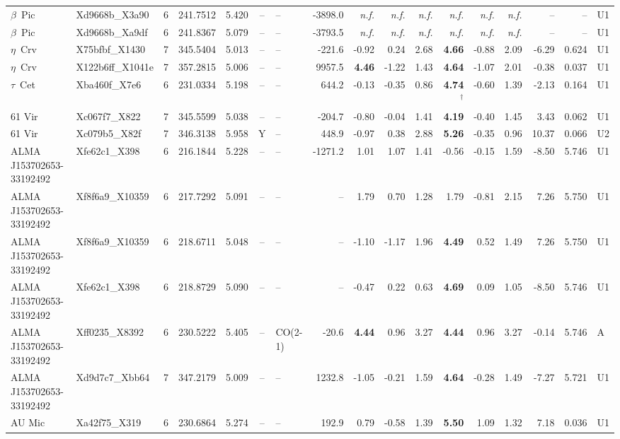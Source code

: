 \begin{tabular}{@{}l@{~}l@{~}c@{~}r@{~}r@{~}c@{~}l@{~}r@{~~}r@{~}r@{~}r@{~~}r@{~}r@{~}r@{~~}r@{~}r@{~}l@{}}
$\beta$~Pic & Xd9668b\_X3a90 & 6 & 241.7512 & 5.420 & -- & -- & -3898.0 & \emph{n.f.} & \emph{n.f.} & \emph{n.f.} & \emph{n.f.} & \emph{n.f.} & \emph{n.f.} & -- & -- & U1 \\
$\beta$~Pic & Xd9668b\_Xa9df & 6 & 241.8367 & 5.079 & -- & -- & -3793.5 & \emph{n.f.} & \emph{n.f.} & \emph{n.f.} & \emph{n.f.} & \emph{n.f.} & \emph{n.f.} & -- & -- & U1 \\
$\eta$~Crv & X75bfbf\_X1430 & 7 & 345.5404 & 5.013 & -- & -- & -221.6 & -0.92 & 0.24 & 2.68 & \textbf{4.66} & -0.88 & 2.09 & -6.29 & 0.624 & U1 \\
$\eta$~Crv & X122b6ff\_X1041e & 7 & 357.2815 & 5.006 & -- & -- & 9957.5 & \textbf{4.46} & -1.22 & 1.43 & \textbf{4.64} & -1.07 & 2.01 & -0.38 & 0.037 & U1 \\
$\tau$~Cet & Xba460f\_X7e6 & 6 & 231.0334 & 5.198 & -- & -- & 644.2 & -0.13 & -0.35 & 0.86 & \textbf{4.74}$^{\dagger}$ & -0.60 & 1.39 & -2.13 & 0.164 & U1 \\
61 Vir & Xc067f7\_X822 & 7 & 345.5599 & 5.038 & -- & -- & -204.7 & -0.80 & -0.04 & 1.41 & \textbf{4.19} & -0.40 & 1.45 & 3.43 & 0.062 & U1 \\
61 Vir & Xc079b5\_X82f & 7 & 346.3138 & 5.958 & Y & -- & 448.9 & -0.97 & 0.38 & 2.88 & \textbf{5.26} & -0.35 & 0.96 & 10.37 & 0.066 & U2 \\
ALMA J153702653-33192492 & Xfe62c1\_X398 & 6 & 216.1844 & 5.228 & -- & -- & -1271.2 & 1.01 & 1.07 & 1.41 & -0.56 & -0.15 & 1.59 & -8.50 & 5.746 & U1 \\
ALMA J153702653-33192492 & Xf8f6a9\_X10359 & 6 & 217.7292 & 5.091 & -- & -- & -- & 1.79 & 0.70 & 1.28 & 1.79 & -0.81 & 2.15 & 7.26 & 5.750 & U1 \\
ALMA J153702653-33192492 & Xf8f6a9\_X10359 & 6 & 218.6711 & 5.048 & -- & -- & -- & -1.10 & -1.17 & 1.96 & \textbf{4.49} & 0.52 & 1.49 & 7.26 & 5.750 & U1 \\
ALMA J153702653-33192492 & Xfe62c1\_X398 & 6 & 218.8729 & 5.090 & -- & -- & -- & -0.47 & 0.22 & 0.63 & \textbf{4.69} & 0.09 & 1.05 & -8.50 & 5.746 & U1 \\
ALMA J153702653-33192492 & Xff0235\_X8392 & 6 & 230.5222 & 5.405 & -- & CO(2-1) & -20.6 & \textbf{4.44} & 0.96 & 3.27 & \textbf{4.44} & 0.96 & 3.27 & -0.14 & 5.746 & A \\
ALMA J153702653-33192492 & Xd9d7c7\_Xbb64 & 7 & 347.2179 & 5.009 & -- & -- & 1232.8 & -1.05 & -0.21 & 1.59 & \textbf{4.64} & -0.28 & 1.49 & -7.27 & 5.721 & U1 \\
AU Mic & Xa42f75\_X319 & 6 & 230.6864 & 5.274 & -- & -- & 192.9 & 0.79 & -0.58 & 1.39 & \textbf{5.50} & 1.09 & 1.32 & 7.18 & 0.036 & U1 \\

\end{tabular}
